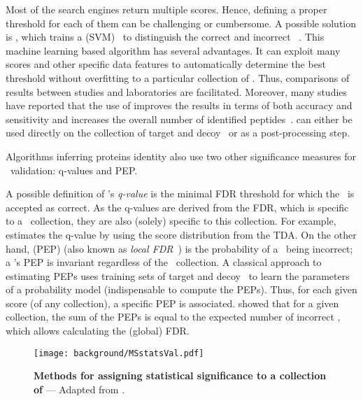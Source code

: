 Most of the search engines return multiple scores.
Hence, defining a proper threshold for each of them can be challenging or cumbersome.
A possible solution is ,
which trains a  (\gls{SVM})~
to distinguish the correct and incorrect \psms{}~.
This machine learning based algorithm has several advantages.
It can exploit many scores and other specific data features
to automatically determine the best threshold
without overfitting to a particular collection of \psms.
Thus, comparisons of results between studies and laboratories are facilitated.
Moreover, many studies have reported that the use of 
improves the results in terms of both accuracy and sensitivity and
increases the overall number of identified peptides~.
 can either be used directly on
the collection of target and decoy \psms\
or as a post-processing step.

\vspace{-0.7mm}
Algorithms inferring proteins identity also use
two other significance measures for \psm\ validation:
q-values and \gls{PEP}.

\vspace{-0.7mm}
A possible definition of \psm's \emph{q-value}\label{qvalP} is
the minimal \gls{FDR} threshold for which the \psm\ is accepted as correct.
As the q-values are derived from the \gls{FDR},
which is specific to a \psm\ collection,
they are also (solely) specific to this collection.
For example,
 estimates the q-value
by using the score distribution from the \gls{TDA}.
On the other hand,
 (\gls{PEP})\label{PEP}
(also known as \emph{local \gls{FDR}}~)
is the probability of a \psm\ being incorrect;
a \psm's \gls{PEP} is invariant regardless of the \psms\ collection.
A classical approach to estimating \glspl{PEP} uses
training sets of target and decoy \psms\ to learn the parameters
of a probability model (indispensable to compute the \glspl{PEP}).
Thus, for each given score (of any collection), a specific \gls{PEP} is associated.
\citet{Choi2008-ec} showed that for a given collection,
the sum of the \glspl{PEP} is equal to the expected number of incorrect \psms,
which allows calculating the (global) \gls{FDR}.

\begin{figure}[!htbp]
    \texttt{[image: background/MSstatsVal.pdf]}\centering
    \vspace{-3mm}
    \caption[Methods for assigning statistical significance]{\label{fig:MSstatval}%
    \textbf{Methods for assigning statistical significance to a collection of \psms}
   --- Adapted from \mycite{Kall2008-tf}.}
\end{figure}

